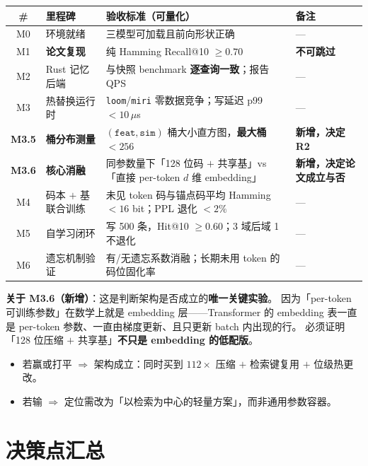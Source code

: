 \documentclass[11pt,a4paper]{ctexart}
\newcommand{\keybox}[1]{%
  \begin{center}\begin{minipage}{0.94\textwidth}%
  \colorbox{graylight}{\begin{minipage}{0.92\textwidth}\vspace{3pt}#1\vspace{3pt}\end{minipage}}%
  \end{minipage}\end{center}}
\newcommand{\warn}[1]{\textcolor{warnred}{\textbf{#1}}}
\theoremstyle{definition}
\begin{document}
\begin{center}
\begin{tabularx}{\textwidth}{@{}clXl@{}}
\toprule
\textbf{\#} & \textbf{里程碑} & \textbf{验收标准（可量化）} & \textbf{备注} \\
\midrule
M0 & 环境就绪 & 三模型可加载且前向形状正确 & — \\
M1 & \textbf{论文复现} & 纯 Hamming Recall@10 $\ge0.70$ & \textbf{不可跳过} \\
M2 & Rust 记忆后端 & 与快照 benchmark \textbf{逐查询一致}；报告 QPS & — \\
M3 & 热替换运行时 & \texttt{loom}/\texttt{miri} 零数据竞争；写延迟 p99 $<10\,\mu$s & — \\
\textbf{M3.5} & \textbf{桶分布测量} & $(\texttt{feat},\texttt{sim})$ 桶大小直方图，\textbf{最大桶 $<256$} & \warn{新增，决定 R2} \\
\textbf{M3.6} & \textbf{核心消融} & 同参数量下「128 位码 $+$ 共享基」vs「直接 per-token $d$ 维 embedding」 & \warn{新增，决定论文成立与否} \\
M4 & 码本 $+$ 基联合训练 & 未见 token 码与锚点码平均 Hamming $<16$ bit；PPL 退化 $<2\%$ & — \\
M5 & 自学习闭环 & 写 500 条，Hit@10 $\ge0.60$；3 域后域 1 不退化 & — \\
M6 & 遗忘机制验证 & 有/无遗忘系数消融；长期未用 token 的码位固化率 & — \\
\bottomrule
\end{tabularx}
\end{center}

\keybox{%
\textbf{关于 M3.6（新增）}：这是判断架构是否成立的\textbf{唯一关键实验}。
因为「per-token 可训练参数」在数学上就是 embedding 层——Transformer 的 embedding 表一直是
per-token 参数、一直由梯度更新、且只更新 batch 内出现的行。
必须证明「128 位压缩 $+$ 共享基」\textbf{不只是 embedding 的低配版}。
\begin{itemize}
\item 若赢或打平 $\Rightarrow$ 架构成立：同时买到 $112\times$ 压缩 $+$ 检索键复用 $+$ 位级热更改。
\item 若输 $\Rightarrow$ 定位需改为「以检索为中心的轻量方案」，而非通用参数容器。
\end{itemize}}

\section{决策点汇总}\label{sec:decisions}
\end{document}

